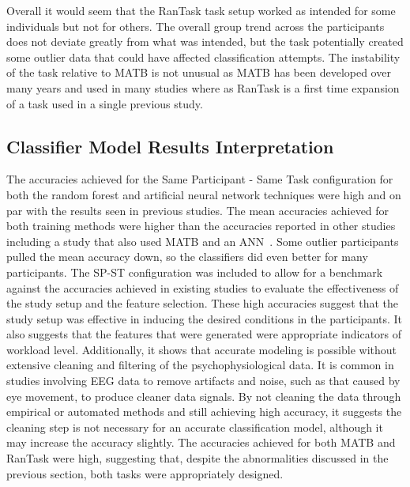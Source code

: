 \documentclass[11pt]{article}
\begin{document}
	Overall it would seem that the RanTask task setup worked as intended for some individuals but not for others. The overall group trend across the participants does not deviate greatly from what was intended, but the task potentially created some outlier data that could have affected classification attempts. The instability of the task relative to MATB is not unusual as MATB has been developed over many years and used in many studies where as RanTask is a first time expansion of a task used in a single previous study. 

	\subsection{Classifier Model Results Interpretation}
	
	The accuracies achieved for the Same Participant - Same Task configuration for both the random forest and artificial neural network techniques were high and on par with the results seen in previous studies. The mean accuracies achieved for both training methods were higher than the accuracies reported in other studies~\cite{Zhang, Yin} including a study that also used MATB and an ANN~\cite{Wilson_2003}. Some outlier participants pulled the mean accuracy down, so the classifiers did even better for many participants. The SP-ST configuration was included to allow for a benchmark against the accuracies achieved in existing studies to evaluate the effectiveness of the study setup and the feature selection. These high accuracies suggest that the study setup was effective in inducing the desired conditions in the participants. It also suggests that the features that were generated were appropriate indicators of workload level. Additionally, it shows that accurate modeling is possible without extensive cleaning and filtering of the psychophysiological data. It is common in studies involving EEG data to remove artifacts and noise, such as that caused by eye movement, to produce cleaner data signals. By not cleaning the data through empirical or automated methods and still achieving high accuracy, it suggests the cleaning step is not necessary for an accurate classification model, although it may increase the accuracy slightly. The accuracies achieved for both MATB and RanTask were high, suggesting that, despite the abnormalities discussed in the previous section, both tasks were appropriately designed.
	
\end{document}
